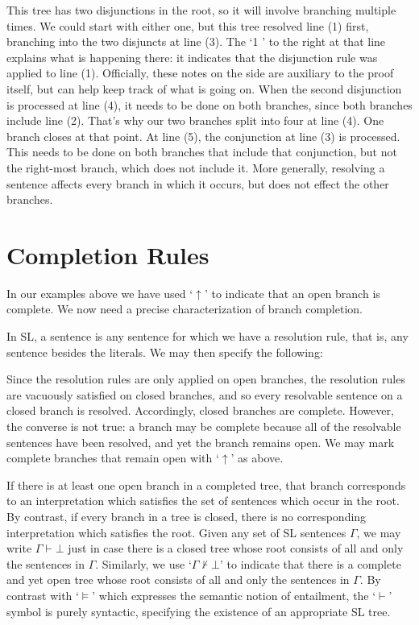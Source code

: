 This tree has two disjunctions in the root, so it will involve branching multiple times.
We could start with either one, but this tree resolved line (1) first, branching into the two disjuncts at line (3).
The `1 \eor' to the right at that line explains what is happening there: it indicates that the disjunction rule was applied to line (1).
Officially, these notes on the side are auxiliary to the proof itself, but can help keep track of what is going on.
When the second disjunction is processed at line (4), it needs to be done on both branches, since both branches include line (2).
That's why our two branches split into four at line (4).
One branch closes at that point.
At line (5), the conjunction at line (3) is processed.
This needs to be done on both branches that include that conjunction, but not the right-most branch, which does not include it.
More generally, resolving a sentence affects every branch in which it occurs, but does not effect the other branches.






\section{Completion Rules}
\label{sec.SL.tree.completion}

In our examples above we have used `$\uparrow$' to indicate that an open branch is complete.
We now need a precise characterization of branch completion.

In SL, a  sentence is any sentence for which we have a resolution rule, that is, any sentence besides the literals.
We may then specify the following:


Since the resolution rules are only applied on open branches, the resolution rules are vacuously satisfied on closed branches, and so every resolvable sentence on a closed branch is resolved.
Accordingly, closed branches are complete.
However, the converse is not true: a branch may be complete because all of the resolvable sentences have been resolved, and yet the branch remains open.
We may mark complete branches that remain open with `$\uparrow$' as above.

If there is at least one open branch in a completed tree, that branch corresponds to an interpretation which satisfies the set of sentences which occur in the root.
By contrast, if every branch in a tree is closed, there is no corresponding interpretation which satisfies the root.
Given any set of SL sentences $\Gamma$, we may write $\Gamma \vdash \bot$ just in case there is a closed tree whose root consists of all and only the sentences in $\Gamma$.
Similarly, we use `$\Gamma \nvdash \bot$' to indicate that there is a complete and yet open tree whose root consists of all and only the sentences in $\Gamma$.
By contrast with `$\models$' which expresses the semantic notion of entailment, the `$\vdash$' symbol is purely syntactic, specifying the existence of an appropriate SL tree.

